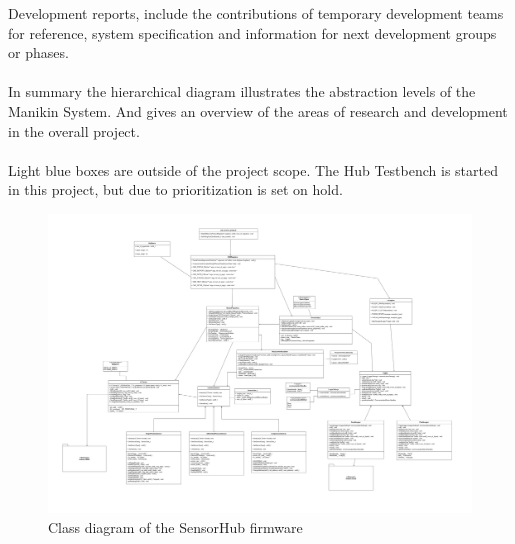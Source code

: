 Development reports, include the contributions of temporary development teams for reference, system specification and information for next development groups or phases.\\\\
In summary the hierarchical diagram illustrates the abstraction levels of the Manikin System. And gives an overview of the areas of research and development in the overall project.\\\\
Light blue boxes are outside of the project scope. The Hub Testbench is started in this project, but due to prioritization is set on hold. 
\pagebreak
\begin{figure}
    \centering
    \includegraphics[scale=0.65]{figures/SensorHub_Class_Diagram.jpg}
    \caption{Class diagram of the SensorHub firmware}
    \label{fig:SensorHubClassDiagram}
\end{figure}